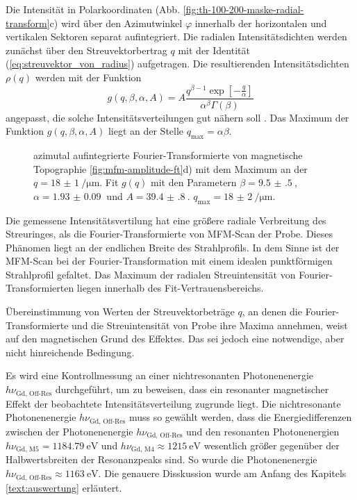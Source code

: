 \noindent
Die Intensität in Polarkoordinaten (Abb. \ref{fig:th-100-200-maske-radial-transform}c) wird über den Azimutwinkel $\varphi$ innerhalb der horizontalen und vertikalen Sektoren separat aufintegriert. Die radialen Intensitätsdichten werden zunächst über den Streuvektorbertrag $q$ mit der Identität (\ref{eq:streuvektor_von_radius}) aufgetragen. Die resultierenden Intensitätsdichten $\rho(q)$ werden mit der Funktion
\begin{equation}
    g(q, \beta, \alpha, A) = A\frac{q^{\beta-1}\exp\left[-\frac{q}{\alpha}\right]}{\alpha^\beta\Gamma(\beta)}
\end{equation}
angepasst, die solche Intensitätsverteilungen gut nähern soll \cite[Kap. 5]{bagschik_employing_2016}. Das Maximum der Funktion $g(q, \beta, \alpha, A)$ liegt an der Stelle $q_\text{max} = \alpha\beta$.

\begin{figure}[H]
    \centering
    
    \caption{azimutal aufintegrierte Fourier-Transformierte von magnetische Topographie  \ref{fig:mfm-amplitude-ft}d) mit dem Maximum an der $q =\SI{18(1)}{\per\micro\meter}$. Fit $g(q)$ mit den Parametern $\beta = \SI{9.5(5)}{}$, $\alpha = \SI{1.93(9)}{}$ und $A = \SI{39.4(8)}{}$. $q_\text{max} = \SI{18(2)}{\per\micro\meter}$.}
    \label{fig:radius_fit}
\end{figure}
\noindent
Die gemessene Intensitätsvertilung hat eine größere radiale Verbreitung des Streuringes, als die Fourier-Transformierte von MFM-Scan der Probe. Dieses Phänomen liegt an der endlichen Breite des Strahlprofils. In dem Sinne ist der MFM-Scan bei der Fourier-Transformation mit einem idealen punktförmigen Strahlprofil gefaltet. Das Maximum der radialen Streuintensität von Fourier-Transformierten liegen innerhalb des Fit-Vertrauensbereichs.

\noindent
Übereinstimmung von Werten der Streuvektorbeträge $q$, an denen die Fourier-Transformierte und die Streuintensität von Probe ihre Maxima annehmen, weist auf den magnetischen Grund des Effektes. Das sei jedoch eine notwendige, aber nicht hinreichende Bedingung.

\noindent
Es wird eine Kontrollmessung an einer nichtresonanten Photonenenergie $h\nu_{\text{Gd, Off-Res}}$ durchgeführt, um zu beweisen, dass ein resonanter magnetischer Effekt der beobachtete Intensitätsverteilung zugrunde liegt. Die nichtresonante Photonenenergie $h\nu_{\text{Gd, Off-Res}}$ muss so gewählt werden, dass die Energiedifferenzen zwischen der Photonenenergie $h\nu_{\text{Gd, Off-Res}}$ und den resonanten Photonenergien $h\nu_{\text{Gd, M5}} = \SI{1184,79}{\eV}$ und $h\nu_{\text{Gd, M4}} \approx \SI{1215}{\eV}$ wesentlich größer gegenüber der Halbwertsbreiten der Resonanzpeaks sind. So wurde die Photonenenergie $h\nu_{\text{Gd, Off-Res}} \approx \SI{1163}{\eV}$. Die genauere Disskussion wurde am Anfang des Kapitels \ref{text:auswertung} erläutert. %

